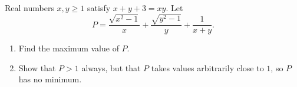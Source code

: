 Real numbers $x,y\ge1$ satisfy $x+y+3=xy$. Let
\[
P=\dfrac{\sqrt{x^{2}-1}}{x}+\dfrac{\sqrt{y^{2}-1}}{y}+\dfrac{1}{x+y}.
\]
\begin{enumerate}
\item[(a)] Find the maximum value of $P$.
\item[(b)] Show that $P>1$ always, but that $P$ takes values arbitrarily close to $1$, so $P$ has no minimum.
\end{enumerate}
